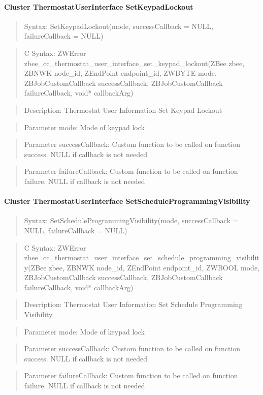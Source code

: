 \paragraph{Cluster ThermostatUserInterface SetKeypadLockout}
\begin{quote}Syntax: SetKeypadLockout(mode, successCallback = NULL, failureCallback = NULL)\end{quote}
\begin{quote}C Syntax: ZWError zbee\_cc\_thermostat\_user\_interface\_set\_keypad\_lockout(ZBee zbee, ZBNWK node\_id, ZEndPoint endpoint\_id, ZWBYTE mode, ZBJobCustomCallback successCallback, ZBJobCustomCallback failureCallback, void* callbackArg)\end{quote}
\begin{quote}Description: Thermostat User Information Set Keypad Lockout\end{quote}
\begin{quote}Parameter mode: Mode of keypad lock\end{quote}
\begin{quote}Parameter successCallback: Custom function to be called on function success. NULL if callback is not needed\end{quote}
\begin{quote}Parameter failureCallback: Custom function to be called on function failure. NULL if callback is not needed\end{quote}


\paragraph{Cluster ThermostatUserInterface SetScheduleProgrammingVisibility}
\begin{quote}Syntax: SetScheduleProgrammingVisibility(mode, successCallback = NULL, failureCallback = NULL)\end{quote}
\begin{quote}C Syntax: ZWError zbee\_cc\_thermostat\_user\_interface\_set\_schedule\_programming\_visibility(ZBee zbee, ZBNWK node\_id, ZEndPoint endpoint\_id, ZWBOOL mode, ZBJobCustomCallback successCallback, ZBJobCustomCallback failureCallback, void* callbackArg)\end{quote}
\begin{quote}Description: Thermostat User Information Set Schedule Programming Visibility\end{quote}
\begin{quote}Parameter mode: Mode of keypad lock\end{quote}
\begin{quote}Parameter successCallback: Custom function to be called on function success. NULL if callback is not needed\end{quote}
\begin{quote}Parameter failureCallback: Custom function to be called on function failure. NULL if callback is not needed\end{quote}



